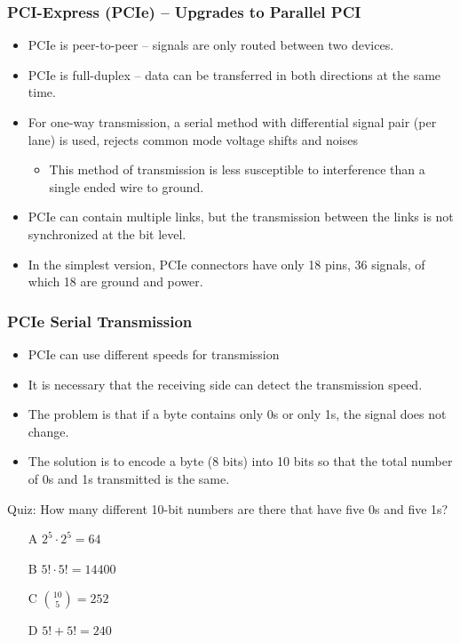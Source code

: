 \documentclass{beamer}
\begin{document}
\begin{frame}
\end{frame}


\begin{frame}
\frametitle{PCI-Express (PCIe) -- Upgrades to Parallel PCI}

\begin{itemize}
\item PCIe is peer-to-peer -- signals are only routed between two devices.
\item PCIe is full-duplex -- data can be transferred in both directions at the same time.
\item For one-way transmission, a serial method with differential signal pair (per lane) is used, rejects common mode voltage shifts and noises
\begin{itemize}
\item This method of transmission is less susceptible to interference than a single ended wire to ground.
\end{itemize}
\item PCIe can contain multiple links, but the transmission between the links is not synchronized at the bit level.
\item In the simplest version, PCIe connectors have only 18 pins, 36 signals, of which 18 are ground and power.
\end{itemize}

\end{frame}

\begin{frame}
\frametitle{PCIe Serial Transmission}

\begin{itemize}
\item PCIe can use different speeds for transmission
\item It is necessary that the receiving side can detect the transmission speed.
\item The problem is that if a byte contains only 0s or only 1s, the signal does not change.
\item The solution is to encode a byte (8 bits) into 10 bits so that the total number of 0s and 1s transmitted is the same.
\end{itemize}

Quiz: How many different 10-bit numbers are there that have five 0s and five 1s?

\begin{itemize}
\item[A] $2^5 \cdot 2^5 = 64$
\item[B] $5! \cdot 5! = 14400$
\item[C] ${10 \choose 5} = 252$
\item[D] $5! + 5! = 240$
\end{itemize}
\end{frame}
\end{document}
